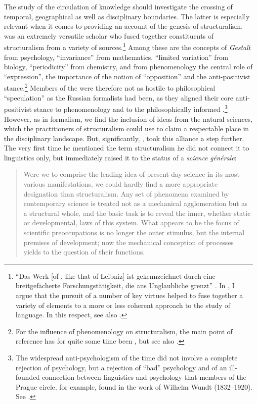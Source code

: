 \documentclass[output=paper]{langscibook}
\begin{document}
The study of the circulation of knowledge should investigate the crossing of temporal, geographical as well as disciplinary boundaries. The latter is especially relevant when it comes to providing an account of the genesis of structuralism. {\Jakobson} was an extremely versatile scholar who fused together constituents of structuralism from a variety of sources.\footnote{``Das Werk [of {\Jakobson}, like that of Leibniz] ist gekennzeichnet durch eine breitgefächerte Forschungstätigkeit, die ans Unglaubliche grenzt'' \citep[17]{Holenstein1975}. In \citet{Karstens2017lonely}, I argue that the pursuit of a number of key virtues helped {\Jakobson} to fuse together a variety of elements to a more or less coherent approach to the study of language. In this respect, see also \citet{Karstens2017blog}.} Among these are the concepts of \emph{Gestalt} from psychology, ``invariance'' from mathematics, ``limited variation'' from biology, ``periodicity'' from chemistry, and from phenomenology the central role of ``expression'', the importance of the notion of ``opposition'' and the anti-positivist stance.\footnote{For the influence of phenomenology on structuralism, the main point of reference has for quite some time been \citet{Holenstein1975}, but see also \citet{Flack2016}.} Members of the {\PragueSchool} were therefore not as hostile to philosophical ``speculation'' as the Russian formalists had been, as they aligned their core anti-positivist stance to phenomenology and to the philosophically informed .\footnote{The widespread anti-psychologism of the time did not involve a complete rejection of psychology, but a rejection of ``bad'' psychology and of an ill-founded connection between linguistics and psychology that members of the Prague circle, for example, found in the work of Wilhelm Wundt (1832--1920). See \citet[139]{Toman1995}.} However, as in formalism, we find the inclusion of ideas from the natural sciences, which the practitioners of structuralism could use to claim a respectable place in the disciplinary landscape. But, significantly, {\Jakobson}, took this alliance a step further. The very first time he mentioned the term structuralism he did not connect it to linguistics only, but immediately raised it to the status of a \emph{science générale}:

\begin{quotation}
\largerpage
Were we to comprise the leading idea of present-day science in its most various manifestations, we could hardly find a more appropriate designation than structuralism. Any set of phenomena examined by contemporary science is treated not as a mechanical agglomeration but as a structural whole, and the basic task is to reveal the inner, whether static or developmental, laws of this system. What appears to be the focus of scientific preoccupations is no longer the outer stimulus, but the internal premises of development; now the mechanical conception of processes yields to the question of their functions. \citep[11]{Jakobson1929}
\end{quotation}
\end{document}
